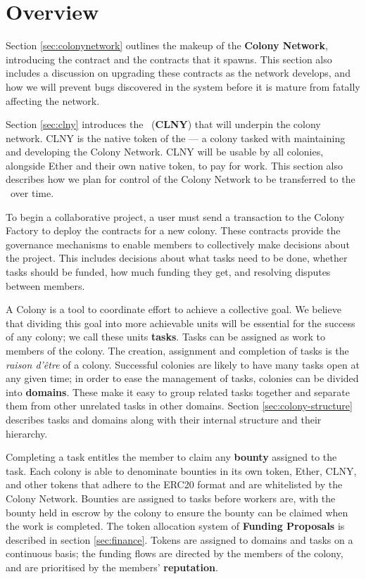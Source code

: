 \section{Overview}

Section \ref{sec:colonynetwork} outlines the makeup of the \textbf{Colony Network}, introducing the  contract and the   contracts that it spawns. This section also includes a discussion on upgrading these contracts as the network develops, and how we will prevent bugs discovered in the system before it is mature from fatally affecting the network.

Section \ref{sec:clny} introduces the \rcts\ (\textbf{CLNY}) that will underpin the colony network. CLNY is the native token of the \textbf{\rc} --- a colony tasked with maintaining and developing the Colony Network. CLNY will be usable by all colonies, alongside Ether and their own native token, to pay for work. This section also describes how we plan for control of the Colony Network to be transferred to the \rc\ over time.

To begin a collaborative project, a user must send a transaction to the Colony Factory to deploy the contracts for a new colony. These contracts provide the governance mechanisms to enable members to collectively make decisions about the project. This includes decisions about what tasks need to be done, whether tasks should be funded, how much funding they get, and resolving disputes between members.

A Colony is a tool to coordinate effort to achieve a collective goal. We believe that dividing this goal into more achievable units will be essential for the success of any colony; we call these units \textbf{tasks}. Tasks can be assigned as work to members of the colony. The creation, assignment and completion of tasks is the \emph{raison d'{\^e}tre} of a colony. Successful colonies are likely to have many tasks open at any given time; in order to ease the management of tasks, colonies can be divided into \textbf{domains}. These make it easy to group related tasks together and separate them from other unrelated tasks in other domains. Section \ref{sec:colony-structure} describes tasks and domains along with their internal structure and their hierarchy.

Completing a task entitles the member to claim any \textbf{bounty} assigned to the task. Each colony is able to denominate bounties in its own token, Ether, CLNY, and other tokens that adhere to the ERC20 format \cite{erc20} and are whitelisted by the Colony Network. Bounties are assigned to tasks before workers are, with the bounty held in escrow by the colony to ensure the bounty can be claimed when the work is completed. The token allocation system of \textbf{Funding Proposals} is described in section \ref{sec:finance}. Tokens are assigned to domains and tasks on a continuous basis; the funding flows are directed by the members of the colony, and are prioritised by the members' \textbf{reputation}. 

